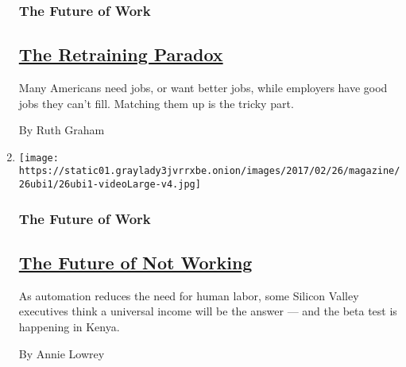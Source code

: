\begin{enumerate}
{  \subsubsection{The Future of Work}\label{the-future-of-work-2}}

  \hypertarget{the-retraining-paradox}{%
  \subsection{\texorpdfstring{\href{/2017/02/23/magazine/retraining-jobs-unemployment.html}{The
  Retraining
  Paradox}}{The Retraining Paradox}}\label{the-retraining-paradox}}

  Many Americans need jobs, or want better jobs, while employers have
  good jobs they can't fill. Matching them up is the tricky part.

  By Ruth Graham
\item
  \texttt{[image: https://static01.graylady3jvrrxbe.onion/images/2017/02/26/magazine/26ubi1/26ubi1-videoLarge-v4.jpg]}

  \hypertarget{the-future-of-work-3}{%
  \subsubsection{The Future of Work}\label{the-future-of-work-3}}

  \hypertarget{the-future-of-not-working}{%
  \subsection{\texorpdfstring{\href{/2017/02/23/magazine/universal-income-global-inequality.html}{The
  Future of Not
  Working}}{The Future of Not Working}}\label{the-future-of-not-working}}

  As automation reduces the need for human labor, some Silicon Valley
  executives think a universal income will be the answer --- and the
  beta test is happening in Kenya.

  By Annie Lowrey
\end{enumerate}

